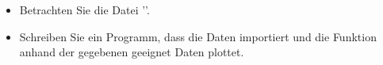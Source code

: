 \begin{aufg}[0]
\begin{itemize}
\item Betrachten Sie die Datei ''.
\item Schreiben Sie ein Programm, dass die Daten importiert und die
  Funktion anhand der gegebenen geeignet Daten plottet.
\end{itemize}
\end{aufg}
